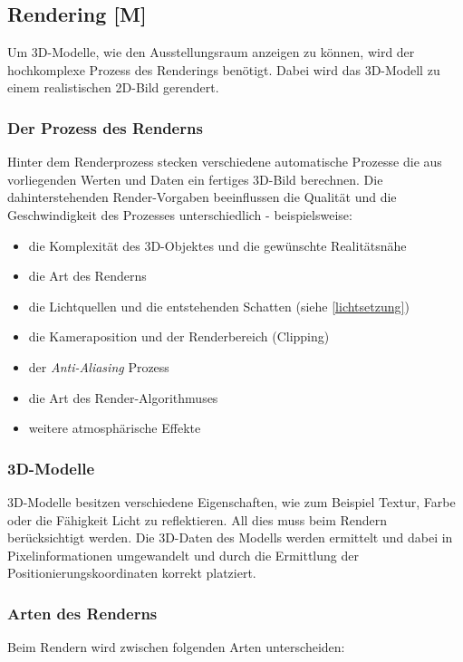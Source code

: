 \subsection{Rendering [M]} 
Um 3D-Modelle, wie den Ausstellungsraum anzeigen zu können, wird der hochkomplexe Prozess des Renderings benötigt. Dabei wird das 3D-Modell zu einem realistischen 2D-Bild gerendert. 
\cite{AdobeRendering} \cite{Rendering3DModels}

\subsubsection{Der Prozess des Renderns}
Hinter dem Renderprozess stecken verschiedene automatische Prozesse die aus vorliegenden Werten und Daten ein fertiges 3D-Bild berechnen. Die dahinterstehenden Render-Vorgaben beeinflussen die Qualität und die Geschwindigkeit des Prozesses unterschiedlich - beispielsweise:

\begin{itemize}
    \item die Komplexität des 3D-Objektes und die gewünschte Realitätsnähe
    \item die Art des Renderns
    \item die Lichtquellen und die entstehenden Schatten (siehe \ref{lichtsetzung})
    \item die Kameraposition und der Renderbereich (Clipping)
    \item der \emph{Anti-Aliasing} Prozess
    \item die Art des Render-Algorithmuses
    \item weitere atmosphärische Effekte \cite{Rendering3DModels}
\end{itemize}

\subsubsection{3D-Modelle}
3D-Modelle besitzen verschiedene Eigenschaften, wie zum Beispiel Textur, Farbe oder die Fähigkeit Licht zu reflektieren. All dies muss beim Rendern berücksichtigt werden. Die 3D-Daten des Modells werden ermittelt und dabei in Pixelinformationen umgewandelt und durch die Ermittlung der Positionierungskoordinaten korrekt platziert.\cite{Rendering3DModels}

\subsubsection{Arten des Renderns}
Beim Rendern wird zwischen folgenden Arten unterscheiden:

